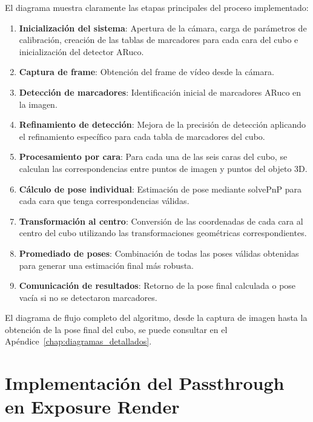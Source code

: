 El diagrama muestra claramente las etapas principales del proceso implementado:
\begin{enumerate}
    \item \textbf{Inicialización del sistema}: Apertura de la cámara, carga de parámetros de calibración, creación de las tablas de marcadores para cada cara del cubo e inicialización del detector ARuco.
    \item \textbf{Captura de frame}: Obtención del frame de vídeo desde la cámara.
    \item \textbf{Detección de marcadores}: Identificación inicial de marcadores ARuco en la imagen.
    \item \textbf{Refinamiento de detección}: Mejora de la precisión de detección aplicando el refinamiento específico para cada tabla de marcadores del cubo.
    \item \textbf{Procesamiento por cara}: Para cada una de las seis caras del cubo, se calculan las correspondencias entre puntos de imagen y puntos del objeto 3D.
    \item \textbf{Cálculo de pose individual}: Estimación de pose mediante solvePnP para cada cara que tenga correspondencias válidas.
    \item \textbf{Transformación al centro}: Conversión de las coordenadas de cada cara al centro del cubo utilizando las transformaciones geométricas correspondientes.
    \item \textbf{Promediado de poses}: Combinación de todas las poses válidas obtenidas para generar una estimación final más robusta.
    \item \textbf{Comunicación de resultados}: Retorno de la pose final calculada o pose vacía si no se detectaron marcadores.
\end{enumerate}

El diagrama de flujo completo del algoritmo, desde la captura de imagen hasta la obtención de la pose final del cubo, se puede consultar en el Apéndice~\ref{chap:diagramas_detallados}.

\section{Implementación del Passthrough en Exposure Render}

